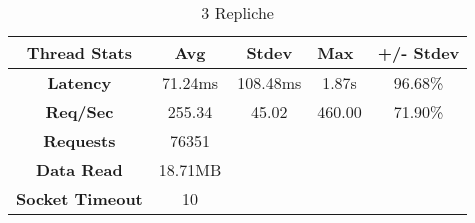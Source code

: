\begin{table}[H]
\caption{3 Repliche}
\centering
\begin{tabular}{|c|c|ccc}
\hline
\textbf{Thread Stats}   & \textbf{Avg} & \multicolumn{1}{c|}{\textbf{Stdev}} & \multicolumn{1}{l|}{\textbf{Max}} & \multicolumn{1}{l|}{\textbf{+/- Stdev}} \\ \hline
\textbf{Latency}        & 71.24ms      & \multicolumn{1}{c|}{108.48ms}       & \multicolumn{1}{c|}{1.87s}        & \multicolumn{1}{c|}{96.68\%}            \\ \hline
\textbf{Req/Sec}        & 255.34       & \multicolumn{1}{c|}{45.02}          & \multicolumn{1}{c|}{460.00}       & \multicolumn{1}{c|}{71.90\%}            \\ \hline
\textbf{Requests}       & 76351        &                                     &                                   &                                         \\ \cline{1-2}
\textbf{Data Read}      & 18.71MB      &                                     &                                   &                                         \\ \cline{1-2}
\textbf{Socket Timeout} & 10           &                                     &                                   &                                         \\ \cline{1-2}
\end{tabular}
\end{table}
